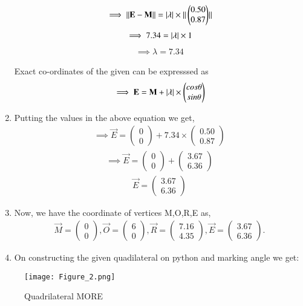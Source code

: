 \documentclass[journal,12pt,twocolumn]{IEEEtran}
\newcommand{\myvec}[1]{\ensuremath{\begin{pmatrix}#1\end{pmatrix}}}
\begin{document}
\begin{enumerate}
\begin{align}
 \end{align}
 \begin{align}
    \implies {\norm{\vec{E}-\vec{M}}}= \abs{\lambda} \times{\norm{\myvec{0.50\\0.87}}}
\end{align}
\begin{align}
   \implies 7.34= \vert\lambda\vert \times 1
\end{align}
\begin{align}
    \implies \lambda = 7.34
\end{align}
\begin{lemma}
Exact co-ordinates of the given  can be expresssed as
\begin{align}
 \implies \vec{E}= \vec{M}+ \abs{\lambda} \times \myvec{cos\theta\\sin\theta}
 \end{align}
  \end{lemma}
  \item Putting the values in the above equation we get,
 \begin{align}
     \implies \vec{E}= \myvec{0\\0}+7.34 \times \myvec{0.50\\0.87}
 \end{align}
 \begin{align}
     \implies \vec{E}= \myvec{0\\0}+\myvec{3.67\\6.36}
 \end{align}
 \begin{align}
     \vec{E}= \myvec{3.67\\6.36}
 \end{align}
 \item Now, we have the coordinate of vertices M,O,R,E as,
\begin{align}
\vec{M}= \myvec{0 \\ 0}, \vec{O}= \myvec{6 \\ 0},  \vec{R}= \myvec{7.16 \\ 4.35}, \vec{E}= \myvec{3.67 \\ 6.36}.
\end{align}    
    \item On constructing the given quadilateral on python and marking angle we get:
\end{enumerate}
\begin{figure}[!ht]
\texttt{[image: Figure\_2.png]}
\caption{Quadrilateral MORE}
\label{fig:Quadrilateral MORE}	
\end{figure}
\end{document}
